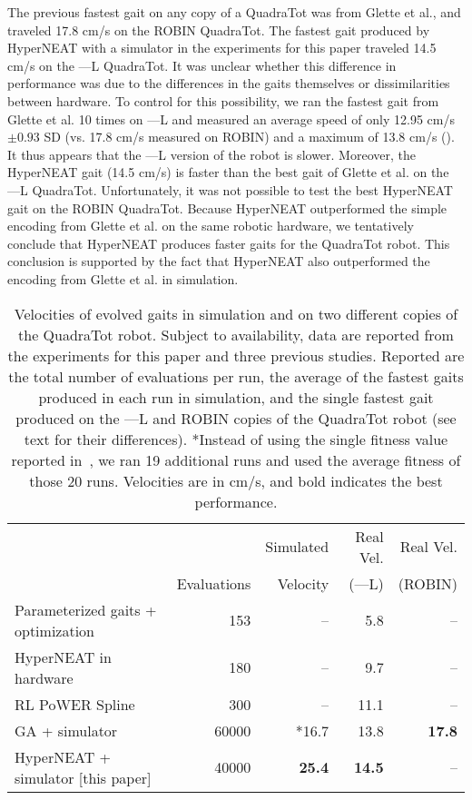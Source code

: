 The previous fastest gait on any copy of a QuadraTot was from Glette
et al., and traveled 17.8 cm/s on the ROBIN QuadraTot. The
fastest gait produced by HyperNEAT with a simulator in the experiments for this paper traveled 14.5
cm/s on the ---L QuadraTot. It was unclear whether this difference in performance was due to
the differences in the gaits themselves or dissimilarities between
hardware. To control for this possibility, we ran the fastest gait
from Glette et al. 10 times on ---L and measured an average speed of
only 12.95 cm/s $\pm0.93$ SD (vs. 17.8 cm/s measured on ROBIN) and a maximum of
13.8 cm/s (). It thus appears that the ---L version of the robot is slower. Moreover, the HyperNEAT gait (14.5 cm/s) is faster than the best gait of Glette et al. on the ---L QuadraTot. Unfortunately, it was not possible to test the best HyperNEAT gait on the ROBIN QuadraTot. Because HyperNEAT outperformed the simple encoding from Glette et al. on the same robotic hardware, we tentatively
conclude that HyperNEAT produces faster gaits for the QuadraTot robot. This conclusion is supported by the fact that HyperNEAT also outperformed the encoding from Glette et al. in simulation. 

\begin{table}
\begin{center}
\begin{tabular}{|l|r|r|r|r|}
\hline
                                         &              & Simulated  & Real Vel. & Real Vel.  \\
                                         & Evaluations  & Velocity &    (---L)     & (ROBIN) \\
\hline
Parameterized gaits + optimization \cite{yos:clune}   &153    & --    & 5.8 & --\\
\hline
HyperNEAT in hardware \cite{yos:clune}                 & 180         & --         &   9.7  & --   \\
\hline
RL PoWER Spline \cite{haocheng}                         & 300         & --         &   11.1 & --\\
\hline
GA + simulator \cite{glette}             & 60000       & *16.7       &   13.8   & \textbf{17.8}  \\
\hline
HyperNEAT + simulator [this paper]                     & 40000       & \textbf{25.4}       &   \textbf{14.5} & --\\
\hline
\end{tabular}
\vspace{.35cm}
\caption{Velocities of evolved gaits in simulation and on two different copies of the QuadraTot robot. Subject to availability, data are reported from the experiments for this paper and three previous studies. Reported are the total number of evaluations per run, the average of the fastest gaits produced in each run in simulation, and the single fastest gait produced on the ---L and ROBIN copies of the QuadraTot robot (see text for their differences). *Instead of using the single fitness value reported in~\cite{glette}, we ran 19 additional runs and used the average fitness of those 20 runs. Velocities are in cm/s, and bold indicates the best performance. }  
\end{center}
\end{table}

